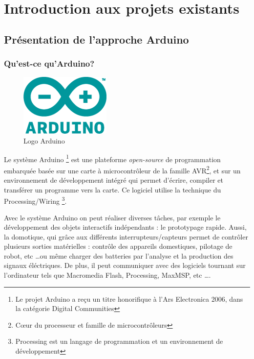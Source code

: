 \part{Introduction aux projets existants}
\chapter[Présentation de l’approche Arduino]{Présentation de l’approche Arduino}
\label{chap:chap2}

\section{Qu'est-ce qu'Arduino?}

\begin{figure}[h]
\begin{center}
\includegraphics[scale=0.4]{../images/Arduino/Arduinologo.png}
\caption{Logo Arduino}
\end{center}
\end{figure}

Le système Arduino \footnote{Le projet Arduino a reçu un titre honorifique à l'Ars Electronica 2006, dans la catégorie Digital Communities}
est une plateforme \textit{open-source} de programmation embarquée basée sur une carte à microcontrôleur de la famille AVR\footnote{
Cœur du processeur et famille de microcontrôleurs}, et sur un environnement
de développement intégré qui permet d'écrire, compiler et transférer un programme vers la carte. Ce logiciel utilise la technique du Processing/Wiring
\footnote{Processing est un langage de programmation et un environnement de développement}.

Avec le système Arduino on peut réaliser diverses tâches, par exemple le développement des objets interactifs indépendants : le prototypage rapide. Aussi,
la domotique, qui grâce aux différents interrupteurs/capteurs permet de contrôler plusieurs sorties matérielles : contrôle des appareils domestiques,
pilotage de robot, etc \ldots ou même charger des batteries par l'analyse et la production des signaux éléctriques.
De plus, il peut communiquer avec des logiciels tournant sur l'ordinateur tels que Macromedia Flash, Processing, MaxMSP, etc \ldots.

